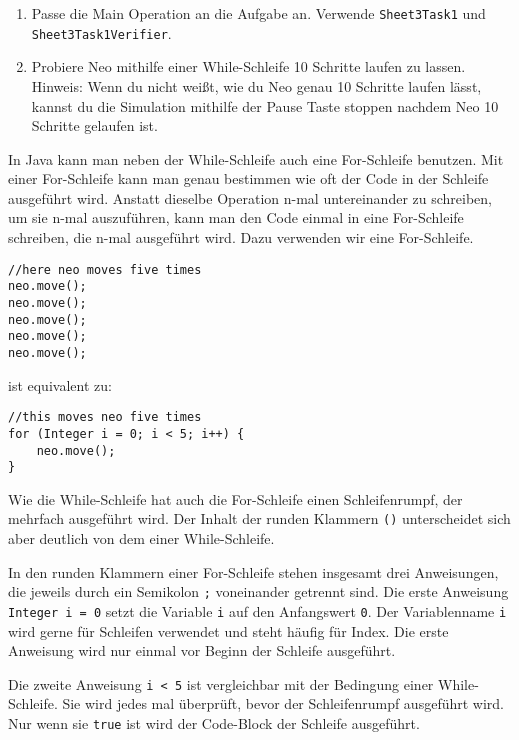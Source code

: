 
\begin{enumerate}
	\item Passe die Main Operation an die Aufgabe an. 
		Verwende \lstinline{Sheet3Task1} und \lstinline{Sheet3Task1Verifier}.
	\item Probiere Neo mithilfe einer While-Schleife 10 Schritte laufen zu lassen.\\
	
		Hinweis: Wenn du nicht weißt, wie du Neo genau 10 Schritte laufen lässt, kannst du die Simulation mithilfe der Pause Taste stoppen nachdem Neo 10 Schritte gelaufen ist.
\end{enumerate}


\begin{Infobox}
	In Java kann man neben der While-Schleife auch eine For-Schleife benutzen.
	Mit einer For-Schleife kann man genau bestimmen wie oft der Code in der Schleife ausgeführt wird.
	Anstatt dieselbe Operation n-mal untereinander zu schreiben, um sie n-mal auszuführen, kann man den Code einmal in eine For-Schleife schreiben, die n-mal ausgeführt wird.
	Dazu verwenden wir eine For-Schleife. 

	\begin{lstlisting}[numbers=none]
//here neo moves five times
neo.move();
neo.move();
neo.move();
neo.move();
neo.move();
	\end{lstlisting}
	
	ist equivalent zu:

	\begin{lstlisting}[numbers=none]
//this moves neo five times
for (Integer i = 0; i < 5; i++) {
	neo.move();
}
	\end{lstlisting}

	Wie die While-Schleife hat auch die For-Schleife einen Schleifenrumpf, der mehrfach ausgeführt wird.
	Der Inhalt der runden Klammern \lstinline{()} unterscheidet sich aber deutlich von dem einer While-Schleife.

	In den runden Klammern einer For-Schleife stehen insgesamt drei Anweisungen, die jeweils durch ein Semikolon \lstinline{;} voneinander getrennt sind.
	Die erste Anweisung \lstinline{Integer i = 0} setzt die Variable \lstinline{i} auf den Anfangswert \lstinline{0}.
	Der Variablenname \lstinline{i} wird gerne für Schleifen verwendet und steht häufig für Index.
	Die erste Anweisung wird nur einmal vor Beginn der Schleife ausgeführt.
	
	Die zweite Anweisung \lstinline{i < 5} ist vergleichbar mit der Bedingung einer While-Schleife.
	Sie wird jedes mal überprüft, bevor der Schleifenrumpf ausgeführt wird.
	Nur wenn sie \lstinline{true} ist wird der Code-Block der Schleife ausgeführt.


\end{Infobox}
